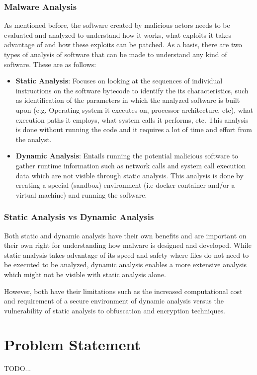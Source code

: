 \subsubsection{Malware Analysis}
As mentioned before, the software created by malicious actors needs to be evaluated and analyzed to
understand how it works, what exploits it takes advantage of and how these exploits can be patched.
As a basis, there are two types of analysis of software that can be made to understand any kind of
software. These are as follows:
\begin{itemize}
	\item \textbf{Static Analysis}: Focuses on looking at the sequences of individual instructions on the software
	      bytecode to identify the its characteristics, such as identification of the parameters in which the
	      analyzed software is built upon (e.g. Operating system it executes on, processor architecture,
	      etc), what execution paths it employs, what system calls it performs, etc. This analysis is done
	      without running the code and it requires a lot of time and effort from the analyst.
	\item \textbf{Dynamic Analysis}: Entails running the potential malicious software to gather runtime information
	      such as network calls and system call execution data which are not visible through static analysis.
	      This analysis is done by creating a special (sandbox) environment (i.e docker container and/or a virtual
	      machine) and running the software.
\end{itemize}

\subsubsection{Static Analysis vs Dynamic Analysis}
Both static and dynamic analysis have their own benefits and are important on their own right for
understanding how malware is designed and developed. While static analysis takes advantage of its
speed and safety where files do not need to be executed to be analyzed, dynamic analysis enables a
more extensive analysis which might not be visible with static analysis alone.

However, both have their limitations such as the increased computational cost and requirement of a
secure environment of dynamic analysis versus the vulnerability of static analysis to obfuscation
and encryption techniques.

\section{Problem Statement}
TODO...

